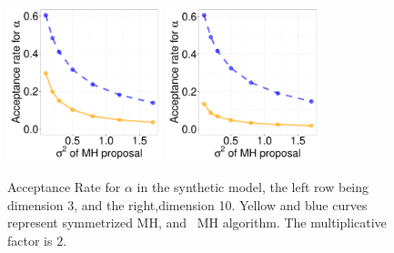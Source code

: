   \begin{figure}[H]
  \centering

  \begin{minipage}[!hp]{0.99\linewidth}
    \includegraphics [width=0.40\textwidth, angle=0]{figs/acc/Q_D3alpha_k2.pdf}
	\hspace{.5in}
    \includegraphics [width=0.40\textwidth, angle=0]{figs/acc/Q_D10alpha_k2.pdf}
  \end{minipage}
    \caption{Acceptance Rate for $\alpha$ in the synthetic model, the left row being dimension 3, and the right,dimension 10.  Yellow and blue curves represent symmetrized MH,
 and \naive\ MH  algorithm. The multiplicative factor is $2$. }
     \label{fig:ACC_Q}
  \end{figure}

